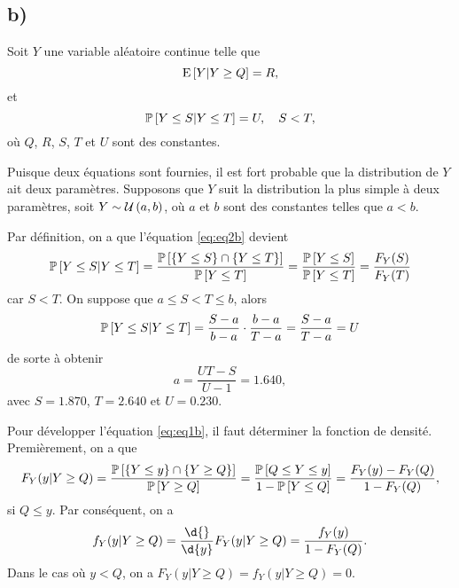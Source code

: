 \documentclass[11pt]{article}
\renewcommand\P[1]{%
	\ensuremath{%
		\mathbb{P}\left[#1\right]%
	}%
}%
\newcommand\Pg[2]{%
	\ensuremath{%
		\mathbb{P}\left[#1\middle\rvert#2\right]%
	}%
}%
\newcommand\Espg[2]{%
	\ensuremath{%
		\mathrm{E}\left[#1\middle\rvert#2\right]%
	}%
}%
\newcommand\Uni[2]{%
	\ensuremath{%
		\mathcal{U}\left(#1,#2\right)%
	}%
}%
\begin{document}
\subsection{b)}
Soit $Y$ une variable aléatoire continue telle que
\begin{equation}\label{eq:eq1b}
    \Espg{Y}{Y\geq Q}=R,
\end{equation}
et
\begin{equation}\label{eq:eq2b}
    \Pg{Y\leq S}{Y\leq T}=U,\quad S<T,
\end{equation}
où $Q$, $R$, $S$, $T$ et $U$ sont des constantes.

Puisque deux équations sont fournies, il est fort probable que la
distribution de $Y$ ait deux paramètres. Supposons que $Y$ suit la
distribution la plus simple à deux paramètres, soit $Y\sim\Uni{a}{b}$,
où $a$ et $b$ sont des constantes telles que $a<b$.

Par définition, on a que l'équation \eqref{eq:eq2b} devient
\begin{equation*}
    \Pg{Y\leq S}{Y\leq T}
    =\frac{\P{\left\{Y\leq S\right\}\cap\left\{Y\leq T\right\}}}{\P{Y\leq T}}
    =\frac{\P{Y\leq S}}{\P{Y\leq T}}
    =\frac{F_Y(S)}{F_Y(T)}
\end{equation*}
car $S<T$. On suppose que $a\leq S<T\leq b$, alors
\begin{equation*}
    \Pg{Y\leq S}{Y\leq T}
    =\frac{S-a}{b-a}\cdot\frac{b-a}{T-a}
    =\frac{S-a}{T-a}=U
\end{equation*}
de sorte à obtenir
\begin{equation*}
    a
    =\frac{UT-S}{U-1}
    =1.640,
\end{equation*}
avec $S=1.870$, $T=2.640$ et $U=0.230$.

Pour développer l'équation \eqref{eq:eq1b}, il faut déterminer la fonction de
densité. Premièrement, on a que
\begin{equation*}
    F_Y(y|Y\geq Q)
    =\frac{\P{\left\{Y\leq y\right\}\cap\left\{Y\geq Q\right\}}}{\P{Y\geq Q}}
    =\frac{\P{Q\leq Y\leq y}}{1-\P{Y\leq Q}}
    =\frac{F_Y(y)-F_Y(Q)}{1-F_Y(Q)},
\end{equation*}
si $Q\leq y$. Par conséquent, on a
\begin{equation*}
    f_Y(y|Y\geq Q)
    =\frac{\d{}}{\d{y}}F_Y(y|Y\geq Q)
    =\frac{f_Y(y)}{1-F_Y(Q)}.
\end{equation*}
Dans le cas où $y<Q$, on a $F_Y(y|Y\geq Q)=f_Y(y|Y\geq Q)=0$.
\end{document}

